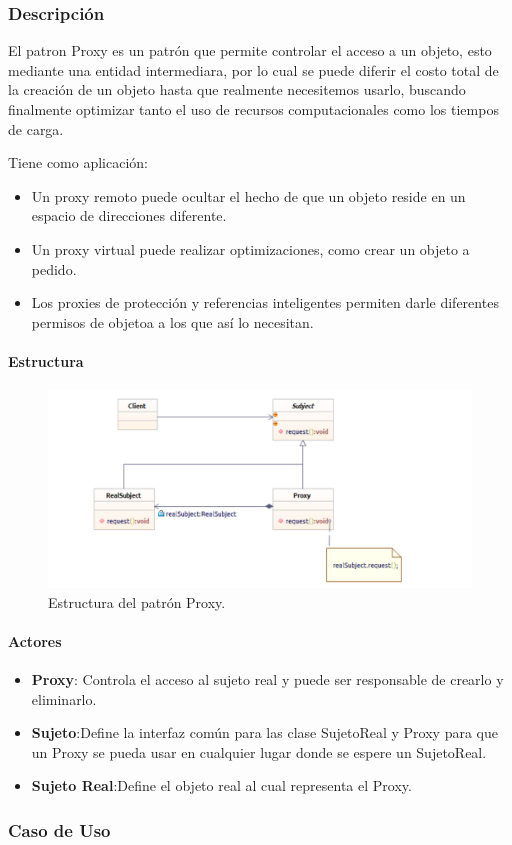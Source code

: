 \subsubsection{Descripción}
El patron Proxy es un patrón que permite controlar el acceso a un objeto, esto  mediante una entidad intermediara, por lo cual se puede diferir el costo total de la creación de un objeto hasta que realmente necesitemos usarlo, buscando finalmente optimizar tanto el uso de recursos computacionales como los tiempos de carga.

Tiene como aplicación:

\begin{itemize}
	\item Un proxy remoto puede ocultar el hecho de que un objeto reside en un espacio de direcciones diferente.
	\item Un proxy virtual puede realizar optimizaciones, como crear un objeto a pedido.
	\item Los proxies de protección y referencias inteligentes permiten darle diferentes permisos de objetoa a los que así lo necesitan.
\end{itemize}

\paragraph{Estructura}

\begin{figure}[th!]
	\centering
	\includegraphics[width=.7\linewidth]{imagenes/Patrones/estructura_Proxy.pdf}
	\caption{Estructura del patrón Proxy.\cite{gof}}	
\end{figure}

\paragraph{Actores}

\begin{itemize}
	\item \textbf{Proxy}: Controla el acceso al sujeto real y puede ser responsable de crearlo y eliminarlo.
	\item \textbf{Sujeto}:Define la interfaz común para las clase SujetoReal y Proxy para que un Proxy se pueda usar en cualquier lugar donde se espere un SujetoReal.
	\item \textbf{Sujeto Real}:Define el objeto real al cual representa el Proxy.
\end{itemize}


\subsubsection{Caso de Uso}


